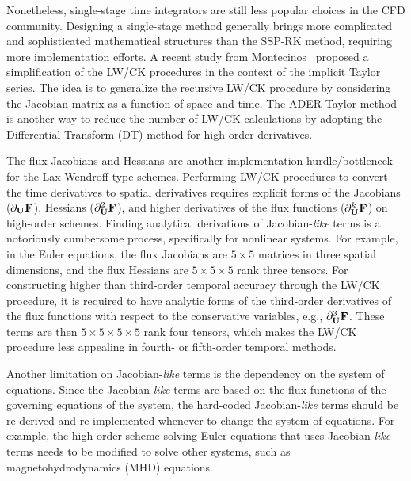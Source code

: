 Nonetheless, single-stage time integrators are still less popular choices in the CFD community.
Designing a single-stage method generally brings more complicated and
sophisticated mathematical structures than the SSP-RK method,
requiring more implementation efforts.
A recent study from Montecinos~\cite{montecinos2020simplified} proposed
a simplification of the LW/CK procedures in the context of the implicit Taylor series.
The idea is to generalize the recursive LW/CK procedure
by considering the Jacobian matrix as a function of space and time.
The ADER-Taylor method~\cite{norman2012multi,norman2013algorithmic,norman2014weno}
is another way to reduce the number of LW/CK calculations
by adopting the Differential Transform (DT) method for high-order derivatives.

The flux Jacobians and Hessians are another implementation hurdle/bottleneck
for the Lax-Wendroff type schemes. Performing LW/CK procedures
to convert the time derivatives to spatial derivatives requires
explicit forms of the Jacobians (\( \partial_{\mathbf{U}} \mathbf{F} \)), Hessians (\( \partial_{\mathbf{U}}^{2} \mathbf{F} \)),
and higher derivatives of the flux functions (\( \partial^{k}_{\mathbf{U}} \mathbf{F} \))
on high-order schemes.
Finding analytical derivations of Jacobian-\textit{like} terms is
a notoriously cumbersome process, specifically for nonlinear systems.
For example, in the Euler equations, the flux Jacobians are \( 5 \times 5 \) matrices
in three spatial dimensions, and the flux Hessians are \( 5 \times 5 \times 5 \) rank three tensors.
For constructing higher than third-order temporal accuracy through the LW/CK procedure,
it is required to have analytic forms of
the third-order derivatives of the flux functions with respect to the conservative variables,
e.g., \( \partial_{\mathbf{U}}^{3} \mathbf{F} \).
These terms are then \( 5 \times 5 \times 5 \times 5 \) rank four tensors,
which makes the LW/CK procedure less appealing in fourth- or fifth-order temporal methods.

Another limitation on Jacobian-\textit{like} terms is the dependency on the system of equations.
Since the Jacobian-\textit{like} terms are based on the flux functions of
the governing equations of the system, the hard-coded Jacobian-\textit{like} terms
should be re-derived and re-implemented whenever to change the system of equations.
For example, the high-order scheme solving Euler equations that uses Jacobian-\textit{like} terms
needs to be modified to solve other systems, such as magnetohydrodynamics (MHD) equations.



